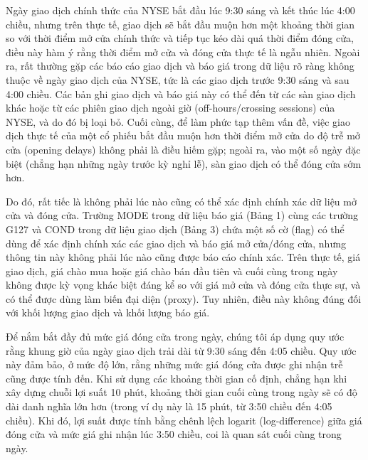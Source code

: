 Ngày giao dịch chính thức của NYSE bắt đầu lúc 9:30 sáng và kết thúc lúc 4:00 chiều, nhưng trên thực tế, giao dịch sẽ bắt đầu muộn hơn một khoảng thời gian so với thời điểm mở cửa chính thức và tiếp tục kéo dài quá thời điểm đóng cửa, điều này hàm ý rằng thời điểm mở cửa và đóng cửa thực tế là ngẫu nhiên. Ngoài ra, rất thường gặp các báo cáo giao dịch và báo giá trong dữ liệu rõ ràng không thuộc về ngày giao dịch của NYSE, tức là các giao dịch trước 9:30 sáng và sau 4:00 chiều. Các bản ghi giao dịch và báo giá này có thể đến từ các sàn giao dịch khác hoặc từ các phiên giao dịch ngoài giờ (off-hours/crossing sessions) của NYSE, và do đó bị loại bỏ. Cuối cùng, để làm phức tạp thêm vấn đề, việc giao dịch thực tế của một cổ phiếu bắt đầu muộn hơn thời điểm mở cửa do độ trễ mở cửa (opening delays) không phải là điều hiếm gặp; ngoài ra, vào một số ngày đặc biệt (chẳng hạn những ngày trước kỳ nghỉ lễ), sàn giao dịch có thể đóng cửa sớm hơn.

Do đó, rất tiếc là không phải lúc nào cũng có thể xác định chính xác dữ liệu mở cửa và đóng cửa. Trường MODE trong dữ liệu báo giá (Bảng 1) cùng các trường G127 và COND trong dữ liệu giao dịch (Bảng 3) chứa một số cờ (flag) có thể dùng để xác định chính xác các giao dịch và báo giá mở cửa/đóng cửa, nhưng thông tin này không phải lúc nào cũng được báo cáo chính xác. Trên thực tế, giá giao dịch, giá chào mua hoặc giá chào bán đầu tiên và cuối cùng trong ngày không được kỳ vọng khác biệt đáng kể so với giá mở cửa và đóng cửa thực sự, và có thể được dùng làm biến đại diện (proxy). Tuy nhiên, điều này không đúng đối với khối lượng giao dịch và khối lượng báo giá.

Để nắm bắt đầy đủ mức giá đóng cửa trong ngày, chúng tôi áp dụng quy ước rằng khung giờ của ngày giao dịch trải dài từ 9:30 sáng đến 4:05 chiều. Quy ước này đảm bảo, ở mức độ lớn, rằng những mức giá đóng cửa được ghi nhận trễ cũng được tính đến. Khi sử dụng các khoảng thời gian cố định, chẳng hạn khi xây dựng chuỗi lợi suất 10 phút, khoảng thời gian cuối cùng trong ngày sẽ có độ dài danh nghĩa lớn hơn (trong ví dụ này là 15 phút, từ 3:50 chiều đến 4:05 chiều). Khi đó, lợi suất được tính bằng chênh lệch logarit (log-difference) giữa giá đóng cửa và mức giá ghi nhận lúc 3:50 chiều, coi là quan sát cuối cùng trong ngày.
